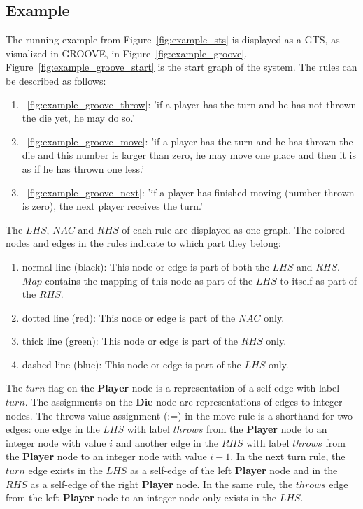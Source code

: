 \subsection{Example}\label{sec:gts_example}
The running example from Figure~\ref{fig:example_sts} is displayed as a GTS, as visualized in GROOVE, in Figure~\ref{fig:example_groove}. Figure~\ref{fig:example_groove_start} is the start graph of the system. The rules can be described as follows:
\begin{enumerate}
  \item~\ref{fig:example_groove_throw}: 'if a player has the turn and he has not thrown the die yet, he may do so.'
  \item~\ref{fig:example_groove_move}: 'if a player has the turn and he has thrown the die and this number is larger than zero, he may move one place and then it is as if he has thrown one less.'
  \item~\ref{fig:example_groove_next}: 'if a player has finished moving (number thrown is zero), the next player receives the turn.'
\end{enumerate}

The $\mathit{LHS}$, $\mathit{NAC}$ and $\mathit{RHS}$ of each rule are displayed as one graph. The colored nodes and edges in the rules indicate to which part they belong:
\begin{enumerate}
  \item normal line (black): This node or edge is part of both the $\mathit{LHS}$ and $\mathit{RHS}$. $\mathit{Map}$ contains the mapping of this node as part of the $\mathit{LHS}$ to itself as part of the $\mathit{RHS}$.
  \item dotted line (red): This node or edge is part of the $\mathit{NAC}$ only.
  \item thick line (green): This node or edge is part of the $\mathit{RHS}$ only.
  \item dashed line (blue): This node or edge is part of the $\mathit{LHS}$ only.
\end{enumerate}

The $turn$ flag on the \textbf{Player} node is a representation of a self-edge with label $turn$. The assignments on the \textbf{Die} node are representations of edges to integer nodes. The throws value assignment (:=) in the move rule is a shorthand for two edges: one edge in the $\mathit{LHS}$ with label $throws$ from the \textbf{Player} node to an integer node with value $i$ and another edge in the $\mathit{RHS}$ with label $throws$ from the \textbf{Player} node to an integer node with value $i-1$. In the next turn rule, the $turn$ edge exists in the $\mathit{LHS}$ as a self-edge of the left \textbf{Player} node and in the $\mathit{RHS}$ as a self-edge of the right \textbf{Player} node. In the same rule, the $throws$ edge from the left \textbf{Player} node to an integer node only exists in the $\mathit{LHS}$.

